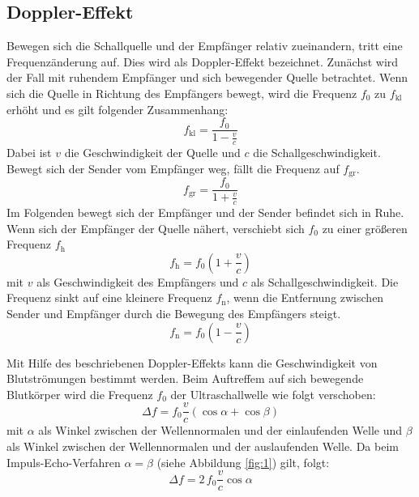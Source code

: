 \subsection{Doppler-Effekt}
Bewegen sich die Schallquelle und der Empfänger relativ zueinandern, tritt eine Frequenzänderung auf. Dies wird als Doppler-Effekt bezeichnet.
Zunächst wird der Fall mit ruhendem Empfänger und sich bewegender Quelle betrachtet. Wenn sich die Quelle in Richtung des Empfängers bewegt, wird die Frequenz $f_0$ zu $f_\mathrm{kl}$ erhöht und es gilt folgender Zusammenhang:
\begin{equation}
  f_\mathrm{kl} = \frac{f_0}{1-\frac{v}{c}}
\end{equation}
Dabei ist $v$ die Geschwindigkeit der Quelle und $c$ die Schallgeschwindigkeit.
Bewegt sich der Sender vom Empfänger weg, fällt die Frequenz auf $f_\mathrm{gr}$.
\begin{equation}
  f_\mathrm{gr} = \frac{f_0}{1+\frac{v}{c}}
\end{equation}
Im Folgenden bewegt sich der Empfänger und der Sender befindet sich in Ruhe. Wenn sich der Empfänger der Quelle nähert, verschiebt sich $f_0$ zu einer größeren Frequenz $f_\mathrm{h}$
\begin{equation}
  f_\mathrm{h} = f_0\left(1+\frac{v}{c}\right)
\end{equation}
mit  $v$ als Geschwindigkeit des Empfängers und $c$ als Schallgeschwindigkeit.
Die Frequenz sinkt auf eine kleinere Frequenz $f_\mathrm{n}$, wenn die Entfernung zwischen Sender und Empfänger durch die Bewegung des Empfängers steigt.
\begin{equation}
  f_\mathrm{n} =f_0\left(1-\frac{v}{c}\right)
\end{equation}

Mit Hilfe des beschriebenen Doppler-Effekts kann die Geschwindigkeit von Blutströmungen bestimmt werden. Beim Auftreffem auf sich bewegende Blutkörper wird die Frequenz $f_0$ der Ultraschallwelle wie folgt verschoben:
\begin{equation}
  \Delta f = f_0 \frac{v}{c}(\cos\alpha + \cos\beta)
\end{equation}
mit $\alpha$ als Winkel zwischen der Wellennormalen und der einlaufenden Welle und $\beta$ als Winkel zwischen der Wellennormalen und der auslaufenden Welle. Da beim Impuls-Echo-Verfahren $\alpha = \beta$ (siehe Abbildung \ref{fig:1}) gilt, folgt:
\begin{equation}
  \Delta f = 2\,f_0\frac{v}{c}\cos\alpha
\end{equation}

